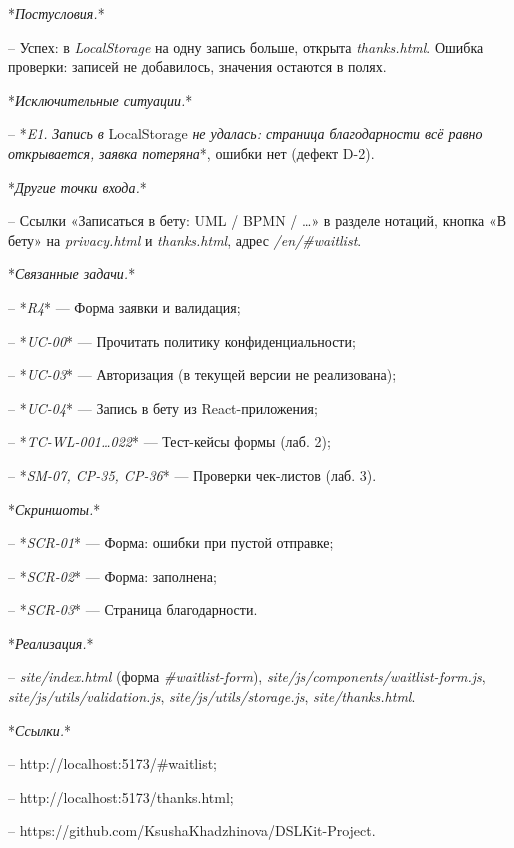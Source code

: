 \documentclass[a4paper,14pt]{extarticle}
\begin{document}
*\textit{Постусловия.}*


– Успех: в \textit{LocalStorage} на одну запись больше, открыта \textit{thanks.html}. Ошибка проверки: записей не добавилось, значения остаются в полях.



*\textit{Исключительные ситуации.}*


– *\textit{E1.}\textit{ Запись в }LocalStorage\textit{ не удалась: страница благодарности всё равно открывается, }\textit{заявка потеряна}*, ошибки нет (дефект D-2).



*\textit{Другие точки входа.}*


– Ссылки «Записаться в бету: UML / BPMN / …» в разделе нотаций, кнопка «В бету» на \textit{privacy.html} и \textit{thanks.html}, адрес \textit{/en/\#waitlist}.



*\textit{Связанные задачи.}*


– *\textit{R4}* — Форма заявки и валидация;

– *\textit{UC-00}* — Прочитать политику конфиденциальности;

– *\textit{UC-03}* — Авторизация (в текущей версии не реализована);

– *\textit{UC-04}* — Запись в бету из React-приложения;

– *\textit{TC-WL-001…022}* — Тест-кейсы формы (лаб. 2);

– *\textit{SM-07, CP-35, CP-36}* — Проверки чек-листов (лаб. 3).



*\textit{Скриншоты.}*


– *\textit{SCR-01}* — Форма: ошибки при пустой отправке;

– *\textit{SCR-02}* — Форма: заполнена;

– *\textit{SCR-03}* — Страница благодарности.



*\textit{Реализация.}*


– \textit{site/index.html} (форма \textit{\#waitlist-form}), \textit{site/js/components/waitlist-form.js}, \textit{site/js/utils/validation.js}, \textit{site/js/utils/storage.js}, \textit{site/thanks.html}.



*\textit{Ссылки.}*


– http://localhost:5173/\#waitlist;

– http://localhost:5173/thanks.html;

– https://github.com/KsushaKhadzhinova/DSLKit-Project.
\end{document}
